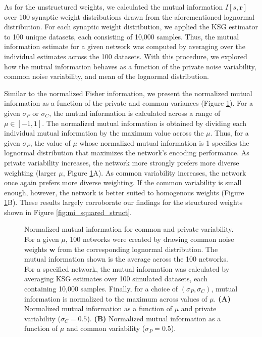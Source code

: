 \documentclass[12pt]{article}
\begin{document}
As for the unstructured weights, we calculated the mutual information $I[s, \mathbf{r}]$ over 100 synaptic weight distributions drawn from the aforementioned lognormal distribution. For each synaptic weight distribution, we applied the KSG estimator to 100 unique datasets, each consisting of 10,000 samples. Thus, the mutual information estimate for a given network was computed by averaging over the individual estimates across the 100 datasets. With this procedure, we explored how the mutual information behaves as a function of the private noise variability, common noise variability, and mean of the lognormal distribution.

Similar to the normalized Fisher information, we present the normalized mutual information as a function of the private and common variances (Figure \ref{fig:figure8}). For a given $\sigma_P$ or $\sigma_C$, the mutual information is calculated across a range of $\mu \in \left[-1, 1\right]$. The normalized mutual information is obtained by dividing each individual mutual information by the maximum value across the $\mu$. Thus, for a given $\sigma_P$, the value of $\mu$ whose normalized mutual information is 1 specifies the lognormal distribution that maximizes the network's encoding performance. As private variability increases, the network more strongly prefers more diverse weighting (larger $\mu$, Figure \ref{fig:figure8}A). As common variability increases, the network once again prefers more diverse weighting. If the common variability is small enough, however, the network is better suited to homogenous weights (Figure \ref{fig:figure8}B). These results largely corroborate our findings for the structured weights shown in Figure \ref{fig:mi_squared_struct}.


\begin{figure}[t]
	\centering
	\caption{Normalized mutual information for common and private variability. For a given $\mu$, 100 networks were created by drawing common noise weights $\mathbf{w}$ from the corresponding lognormal distribution. The mutual information shown is the average across the 100 networks. For a specified network, the mutual information was calculated by averaging KSG estimates over  100 simulated datasets, each containing 10,000 samples.  Finally, for a choice of $(\sigma_P, \sigma_C)$, mutual information is normalized to the maximum across values of $\mu$. \textbf{(A)} Normalized mutual information as a function of $\mu$ and private variability ($\sigma_C = 0.5$). \textbf{(B)} Normalized mutual information as a function of $\mu$ and common variability ($\sigma_P = 0.5$).}
	\label{fig:figure8}
\end{figure}
	
\end{document}
